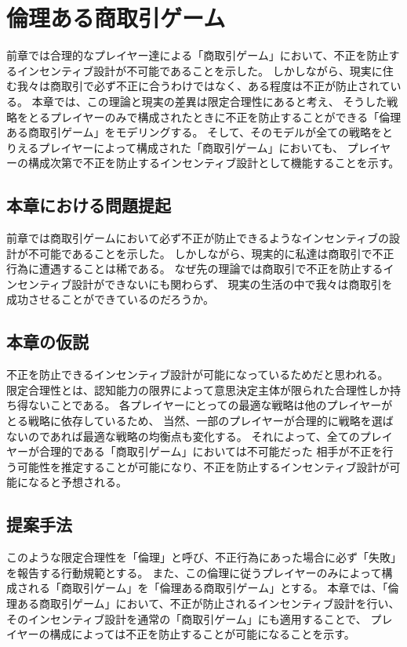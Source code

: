 \chapter{倫理ある商取引ゲーム}
前章では合理的なプレイヤー達による「商取引ゲーム」において、不正を防止するインセンティブ設計が不可能であることを示した。
しかしながら、現実に住む我々は商取引で必ず不正に合うわけではなく、ある程度は不正が防止されている。
本章では、この理論と現実の差異は限定合理性にあると考え、
そうした戦略をとるプレイヤーのみで構成されたときに不正を防止することができる「倫理ある商取引ゲーム」をモデリングする。
そして、そのモデルが全ての戦略をとりえるプレイヤーによって構成された「商取引ゲーム」においても、
プレイヤーの構成次第で不正を防止するインセンティブ設計として機能することを示す。

\section{本章における問題提起}
前章では商取引ゲームにおいて必ず不正が防止できるようなインセンティブの設計が不可能であることを示した。
しかしながら、現実的に私達は商取引で不正行為に遭遇することは稀である。
なぜ先の理論では商取引で不正を防止するインセンティブ設計ができないにも関わらず、
現実の生活の中で我々は商取引を成功させることができているのだろうか。

\section{本章の仮説}
不正を防止できるインセンティブ設計が可能になっているためだと思われる。
限定合理性とは、認知能力の限界によって意思決定主体が限られた合理性しか持ち得ないことである。
各プレイヤーにとっての最適な戦略は他のプレイヤーがとる戦略に依存しているため、
当然、一部のプレイヤーが合理的に戦略を選ばないのであれば最適な戦略の均衡点も変化する。
それによって、全てのプレイヤーが合理的である「商取引ゲーム」においては不可能だった
相手が不正を行う可能性を推定することが可能になり、不正を防止するインセンティブ設計が可能になると予想される。

\section{提案手法}
このような限定合理性を「倫理」と呼び、不正行為にあった場合に必ず「失敗」を報告する行動規範とする。
また、この倫理に従うプレイヤーのみによって構成される「商取引ゲーム」を「倫理ある商取引ゲーム」とする。
本章では、「倫理ある商取引ゲーム」において、不正が防止されるインセンティブ設計を行い、
そのインセンティブ設計を通常の「商取引ゲーム」にも適用することで、
プレイヤーの構成によっては不正を防止することが可能になることを示す。

